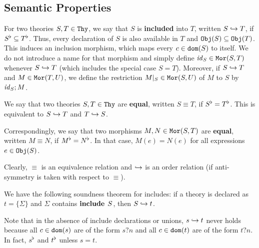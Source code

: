 
\subsection{Semantic Properties}

For two theories $S,T\in\mathtt{Thy}$, we say that $S$ is \textbf{included} into $T$, written $S\hookrightarrow T$, if $S^\flat\subseteq T^\flat$.
Thus, every declaration of $S$ is also available in $T$ and $\mathtt{Obj}(S)\subseteq\mathtt{Obj}(T)$.
This induces an inclusion morphism, which maps every $c\in\mathtt{dom}(S)$ to itself.
We do not introduce a name for that morphism and simply define $\mathit{id}_{S}\in\mathtt{Mor}(S,T)$ whenever $S\hookrightarrow T$ (which includes the special case $S=T$).
Moreover, if $S\hookrightarrow T$ and $M\in\mathtt{Mor}(T,U)$, we define the restriction $M|_S\in\mathtt{Mor}(S,U)$ of $M$ to $S$ by $\mathit{id}_{S};M$.

We say that two theories $S,T\in\mathtt{Thy}$ are \textbf{equal}, written $S\equiv T$, if $S^\flat=T^\flat$.
This is equivalent to $S\hookrightarrow T$ and $T\hookrightarrow S$.

Correspondingly, we say that two morphisms $M,N\in\mathtt{Mor}(S,T)$ are \textbf{equal}, written $M\equiv N$, if $M^\flat=N^\flat$.
In that case, $M(e)=N(e)$ for all expressions $e\in\mathtt{Obj}(S)$.

Clearly, $\equiv$ is an equivalence relation and $\hookrightarrow$ is an order relation (if anti-symmetry is taken with respect to $\equiv$).

\begin{example}\label{rel:incl}
We have the following soundness theorem for includes: if a theory is declared as $t=\{\Sigma\}$ and $\Sigma$ contains $\operatorname{\mathbf{include}}{\;S}$, then $S\hookrightarrow t$.

Note that in the absence of include declarations or unions, $s\hookrightarrow t$ never holds because all $c\in\mathtt{dom}(s)$ are of the form $s?n$ and all $c\in\mathtt{dom}(t)$ are of the form $t?n$.
In fact, $s^\flat$ and $t^\flat$ unless $s=t$.
\end{example}

